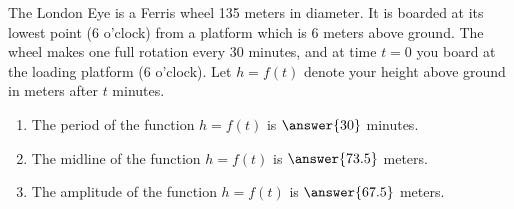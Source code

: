 \documentclass{ximera}
\author{Kenneth Berglund}
\begin{document}
\licenseAPC
\begin{exercise}
The London Eye is a Ferris wheel 135 meters in diameter. It is boarded at its lowest point (6 o'clock) from a platform which is 6 meters above ground. The wheel makes one full rotation every 30 minutes, and at time $t = 0$ you board at the loading platform (6 o'clock). Let $h = f(t)$ denote your height above ground in meters after $t$ minutes.

\begin{enumerate}
\item The period of the function $h = f(t)$ is $\answer{30}$ minutes.

\item The midline of the function $h = f(t)$ is $\answer{73.5}$ meters.

\item The amplitude of the function $h = f(t)$ is $\answer{67.5}$ meters.


\end{enumerate}
\end{exercise}
\end{document}
